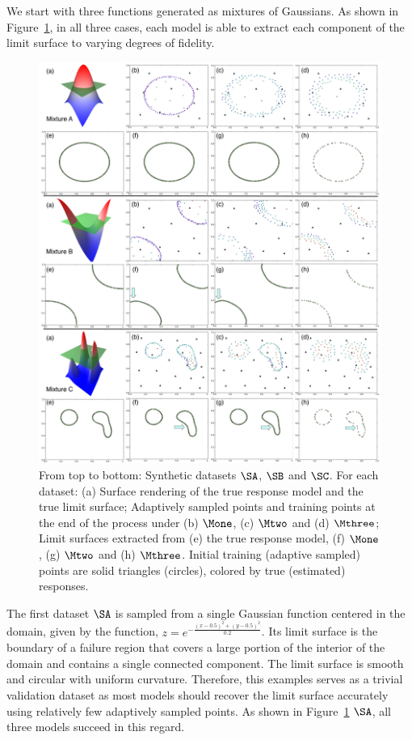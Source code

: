 We start with three functions generated as mixtures of Gaussians.
%
As shown in Figure~\ref{fig:synthetic-A-B-C-GMM}, in all three cases, each model is able to extract each component of the limit surface to varying degrees of fidelity.

\begin{figure}[!ht]
\centering
\includegraphics[width=1.0\textwidth]{figs/chap5/synthetic-A-B-C-GMM}
\caption{From top to bottom: Synthetic datasets $\protect\SA$, $\protect\SB$ and $\protect\SC$.
For each dataset: (a) Surface rendering of the true response model and the true limit surface; Adaptively sampled points and training points at the end of the process under (b) $\protect\Mone$, (c) $\protect\Mtwo$ and (d) $\protect\Mthree$;
Limit surfaces extracted from (e) the true response model, (f) $\protect\Mone$, (g) $\protect\Mtwo$ and (h) $\protect\Mthree$.
Initial training (adaptive sampled) points are solid triangles (circles), colored by true (estimated) responses.
}
\label{fig:synthetic-A-B-C-GMM}
\end{figure}

The first dataset $\SA$ is sampled from a single Gaussian function centered in the domain, given by the function, $z = e^{-\frac{(x-0.5)^2+(y-0.5)^2}{0.2}}$.
%
Its limit surface is the boundary of a failure region that covers a large portion of the interior of the domain and contains a single connected component.
%
The limit surface is smooth and circular with uniform curvature.
%
Therefore, this examples serves as a trivial validation dataset as most models should recover the limit surface accurately using relatively few adaptively sampled points.
%
As shown in Figure~\ref{fig:synthetic-A-B-C-GMM} $\SA$, all three models succeed in this regard.

